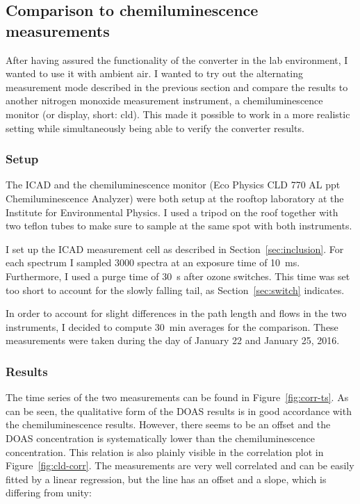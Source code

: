 \subsection{Comparison to chemiluminescence measurements}
\label{sec:cld}

After having assured the functionality of the converter in the lab
environment, I wanted to use it with ambient air. I wanted to try out
the alternating measurement mode described in the previous section and
compare the results to another nitrogen monoxide measurement
instrument, a chemiluminescence monitor (or display, short: cld). This
made it possible to work in a more realistic setting while
simultaneously being able to verify the converter results.

\subsubsection{Setup}
\label{sec:cld-setup}

The  ICAD and the chemiluminescence monitor (Eco Physics CLD
770 AL ppt Chemiluminescence  Analyzer) were both setup at the
rooftop laboratory at the Institute for Environmental Physics. I used
a tripod on the roof together with two teflon tubes to make sure to
sample at the same spot with both instruments.

I set up the ICAD measurement cell as described in
Section~\ref{sec:inclusion}. For each spectrum I sampled 3000 spectra
at an exposure time of \SI{10}{\milli\second}. Furthermore, I used a
purge time of \SI{30}{\second} after ozone switches. This time was set
too short to account for the slowly falling tail, as
Section~\ref{sec:switch} indicates.

In order to account for slight differences in the path length and
flows in the two instruments, I decided to compute \SI{30}{\minute}
averages for the comparison. These measurements were taken during the
day of January 22 and January 25, 2016.

\subsubsection{Results}
\label{sec:cld-results}

The time series of the two measurements can be found in
Figure~\ref{fig:corr-ts}. As can be seen, the qualitative form of the
DOAS results is in good accordance with the chemiluminescence results.
However, there seems to be an offset and the DOAS concentration is
systematically lower than the chemiluminescence concentration. This
relation is also plainly visible in the correlation plot in
Figure~\ref{fig:cld-corr}. The measurements are very well correlated
and can be easily fitted by a linear regression, but the line has an
offset and a slope, which is differing from unity:

